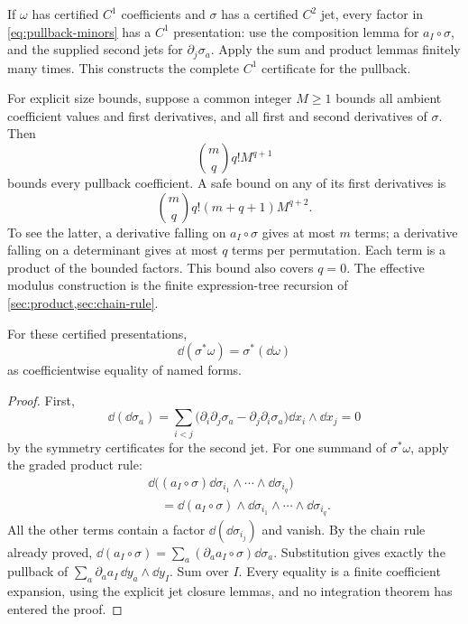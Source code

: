 If $\omega$ has certified $C^1$ coefficients and $\sigma$ has a certified
$C^2$ jet, every factor in \eqref{eq:pullback-minors} has a $C^1$
presentation: use the composition lemma for $a_I\circ\sigma$, and the
supplied second jets for $\partial_j\sigma_a$. Apply the sum and product
lemmas finitely many times. This constructs the complete $C^1$ certificate
for the pullback.

For explicit size bounds, suppose a common integer $M\ge1$ bounds all
ambient coefficient values and first derivatives, and all first and
second derivatives of $\sigma$. Then
\[
 \binom mq q!M^{q+1}
\]
bounds every pullback coefficient. A safe bound on any of its first
derivatives is
\[
 \binom mq q!(m+q+1)M^{q+2}.
\]
To see the latter, a derivative falling on $a_I\circ\sigma$ gives at most
$m$ terms; a derivative falling on a determinant gives at most $q$ terms
per permutation. Each term is a product of the bounded factors. This
bound also covers $q=0$. The effective modulus construction is the finite
expression-tree recursion of \cref{sec:product,sec:chain-rule}.

\begin{lemma}\label{lem:naturality}
For these certified presentations,
\[
 \dd(\sigma^*\omega)=\sigma^*(\dd\omega)
\]
as coefficientwise equality of named forms.
\end{lemma}
\begin{proof}
First,
\[
 \dd(\dd\sigma_a)
 =\sum_{i<j}
   \bigl(\partial_i\partial_j\sigma_a
          -\partial_j\partial_i\sigma_a\bigr)\dd x_i\wedge\dd x_j=0
\]
by the symmetry certificates for the second jet. For one summand of
$\sigma^*\omega$, apply the graded product rule:
\begin{align*}
 &\dd\bigl((a_I\circ\sigma)
                  \dd\sigma_{i_1}\wedge\cdots\wedge\dd\sigma_{i_q}\bigr)\\
 &\quad=\dd(a_I\circ\sigma)
                  \wedge\dd\sigma_{i_1}\wedge\cdots\wedge\dd\sigma_{i_q}.
\end{align*}
All the other terms contain a factor $\dd(\dd\sigma_{i_j})$ and vanish.
By the chain rule already proved,
$\dd(a_I\circ\sigma)=\sum_a(\partial_a a_I\circ\sigma)\dd\sigma_a$.
Substitution gives exactly the pullback of
$\sum_a\partial_a a_I\,\dd y_a\wedge\dd y_I$. Sum over $I$.
Every equality is a finite coefficient expansion, using the explicit
jet closure lemmas, and no integration theorem has entered the proof.
\end{proof}

